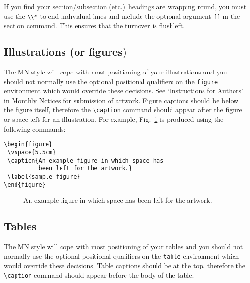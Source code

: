 If you find your section/subsection (etc.)\ headings are wrapping round, 
you must use the \verb"\\*" to end individual lines and include the 
optional argument \verb"[]" in the section command. This ensures that 
the turnover is flushleft.

\subsection{Illustrations (or figures)}

The MN style will cope with most positioning of your illustrations and
you should not normally use the optional positional qualifiers on the
\verb"figure" environment which would override these decisions. See
`Instructions for Authors' in Monthly Notices for submission of
artwork. Figure captions should be below the figure itself, therefore
the \verb"\caption" command should appear after the figure or space
left for an illustration. For example, Fig.~\ref{sample-figure} is
produced using the following commands:
%
\begin{verbatim}
\begin{figure}
 \vspace{5.5cm}
 \caption{An example figure in which space has
          been left for the artwork.}
 \label{sample-figure}
\end{figure}
\end{verbatim}

\begin{figure}
  \vspace{5.5cm}
  \caption{An example figure in which space has been
           left for the artwork.}
  \label{sample-figure}
\end{figure}

\subsection{Tables}

The MN style will cope with most positioning of your tables and you
should not normally use the optional positional qualifiers on the
\verb"table" environment which would override these decisions. Table
captions should be at the top, therefore the \verb"\caption" command
should appear before the body of the table. 

